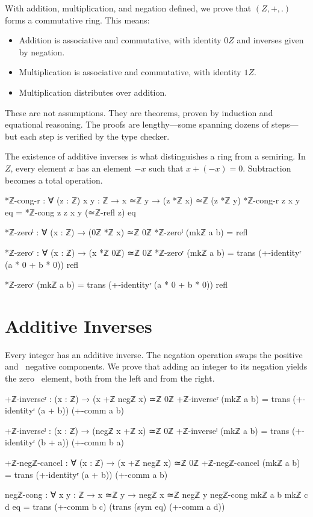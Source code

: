 \documentclass[11pt,a4paper]{book}
\def\cdot{.}%
\def\mathbb#1{#1}%
\begin{document}
With addition, multiplication, and negation defined, we prove that $(\mathbb{Z}, +, \cdot)$ 
forms a commutative ring. This means:
\begin{itemize}
\item Addition is associative and commutative, with identity $0\mathbb{Z}$ and 
  inverses given by negation.
\item Multiplication is associative and commutative, with identity $1\mathbb{Z}$.
\item Multiplication distributes over addition.
\end{itemize}

These are not assumptions. They are theorems, proven by induction and equational reasoning. 
The proofs are lengthy—some spanning dozens of steps—but each step is verified by the 
type checker.

The existence of additive inverses is what distinguishes a ring from a semiring. In $\mathbb{Z}$, 
every element $x$ has an element $-x$ such that $x + (-x) = 0$. Subtraction becomes 
a total operation.

\begin{code}
*ℤ-cong-r : ∀ (z : ℤ) {x y : ℤ} → x ≃ℤ y → (z *ℤ x) ≃ℤ (z *ℤ y)
*ℤ-cong-r z {x} {y} eq = *ℤ-cong {z} {z} {x} {y} (≃ℤ-refl z) eq

*ℤ-zeroˡ : ∀ (x : ℤ) → (0ℤ *ℤ x) ≃ℤ 0ℤ
*ℤ-zeroˡ (mkℤ a b) = refl

*ℤ-zeroʳ : ∀ (x : ℤ) → (x *ℤ 0ℤ) ≃ℤ 0ℤ
*ℤ-zeroʳ (mkℤ a b) = 
  trans (+-identityʳ (a * 0 + b * 0)) refl
\end{code}
*ℤ-zeroʳ (mkℤ a b) = 
  trans (+-identityʳ (a * 0 + b * 0)) refl

\section{Additive Inverses}

Every integer has an additive inverse. The negation operation swaps the positive and \
negative components. We prove that adding an integer to its negation yields the zero \
element, both from the left and from the right.

\begin{code}
+ℤ-inverseʳ : (x : ℤ) → (x +ℤ negℤ x) ≃ℤ 0ℤ
+ℤ-inverseʳ (mkℤ a b) = trans (+-identityʳ (a + b)) (+-comm a b)

+ℤ-inverseˡ : (x : ℤ) → (negℤ x +ℤ x) ≃ℤ 0ℤ
+ℤ-inverseˡ (mkℤ a b) = trans (+-identityʳ (b + a)) (+-comm b a)

+ℤ-negℤ-cancel : ∀ (x : ℤ) → (x +ℤ negℤ x) ≃ℤ 0ℤ
+ℤ-negℤ-cancel (mkℤ a b) = trans (+-identityʳ (a + b)) (+-comm a b)

negℤ-cong : ∀ {x y : ℤ} → x ≃ℤ y → negℤ x ≃ℤ negℤ y
negℤ-cong {mkℤ a b} {mkℤ c d} eq = 
  trans (+-comm b c) (trans (sym eq) (+-comm a d))
\end{code}
\end{document}
